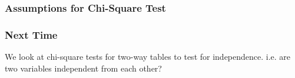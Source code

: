 \documentclass[handout]{beamer}
\newcommand{\blue}[1]{\textcolor{blue2}{#1}}
\begin{document}
\begin{frame}[fragile]
\frametitle{Assumptions for Chi-Square Test}
%
%
\end{frame}


\begin{frame}[fragile]
\frametitle{Next Time}
We look at \blue{chi-square tests for two-way tables} to test for \blue{independence}.  i.e. are two variables independent from each other?

\end{frame}
\end{document}

